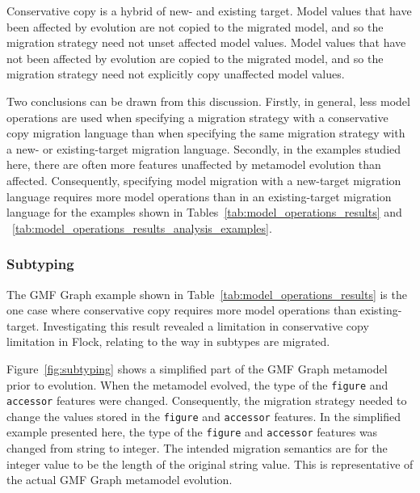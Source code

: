 Conservative copy is a hybrid of new- and existing target. Model values that have been affected by evolution are not copied to the migrated model, and so the migration strategy need not unset affected model values. Model values that have not been affected by evolution are copied to the migrated model, and so the migration strategy need not explicitly copy unaffected model values.

Two conclusions can be drawn from this discussion. Firstly, in general, less model operations are used when specifying a migration strategy with a conservative copy migration language than when specifying the same migration strategy with a new- or existing-target migration language. Secondly, in the examples studied here, there are often more features unaffected by metamodel evolution than affected. Consequently, specifying model migration with a new-target migration language requires more model operations than in an existing-target migration language for the examples shown in Tables~\ref{tab:model_operations_results} and ~\ref{tab:model_operations_results_analysis_examples}.

\subsubsection{Subtyping}
The GMF Graph example shown in Table~\ref{tab:model_operations_results} is the one case where conservative copy requires more model operations than existing-target. Investigating this result revealed a limitation in conservative copy limitation in Flock, relating to the way in subtypes are migrated.

Figure~\ref{fig:subtyping} shows a simplified part of the GMF Graph metamodel prior to evolution. When the metamodel evolved, the type of the \texttt{figure} and \texttt{accessor} features were changed. Consequently, the migration strategy needed to change the values stored in the \texttt{figure} and \texttt{accessor} features. In the simplified example presented here, the type of the \texttt{figure} and \texttt{accessor} features was changed from string to integer. The intended migration semantics are for the integer value to be the length of the original string value. This is representative of the actual GMF Graph metamodel evolution.

